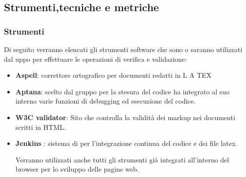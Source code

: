 
\subsection{Strumenti,tecniche e metriche}

\subsubsection{Strumenti}

Di seguito verranno elencati gli strumenti software che sono o saranno utilizzati dal
uppo per effettuare le operazioni di verifica e validazione:
\begin{itemize}

\item \textbf{Aspell}: correttore ortografico per documenti redatti in L A TEX

\item \textbf{Aptana}: scelto dal gruppo per la stesura del codice ha integrato al suo interno varie funzioni di debugging ed esecuzione del codice.

\item \textbf{W3C validator}: Sito che controlla la validità dei markup nei documenti scritti in HTML.

\item \textbf{Jenkins} : sistema di per l'integrazione continua del codice e dei file latex.

Verranno utilizzati anche tutti gli strumenti già integrati all'interno del browser per lo sviluppo delle pagine web.

\end{itemize}
